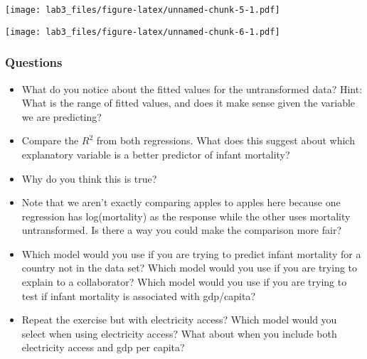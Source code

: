 \documentclass[
]{article}
\newenvironment{Shaded}{\begin{snugshade}}{\end{snugshade}}
\newcommand{\AttributeTok}[1]{\textcolor[rgb]{0.13,0.29,0.53}{#1}}
\newcommand{\DecValTok}[1]{\textcolor[rgb]{0.00,0.00,0.81}{#1}}
\newcommand{\FunctionTok}[1]{\textcolor[rgb]{0.13,0.29,0.53}{\textbf{#1}}}
\newcommand{\NormalTok}[1]{#1}
\newcommand{\OtherTok}[1]{\textcolor[rgb]{0.56,0.35,0.01}{#1}}
\newcommand{\SpecialCharTok}[1]{\textcolor[rgb]{0.81,0.36,0.00}{\textbf{#1}}}
\newcommand{\StringTok}[1]{\textcolor[rgb]{0.31,0.60,0.02}{#1}}
\providecommand{\tightlist}{%
  \setlength{\itemsep}{0pt}\setlength{\parskip}{0pt}}
\begin{document}
\texttt{[image: lab3\_files/figure-latex/unnamed-chunk-5-1.pdf]}

\begin{Shaded}
\end{Shaded}

\texttt{[image: lab3\_files/figure-latex/unnamed-chunk-6-1.pdf]}

\subsubsection{Questions}\label{questions-4}

\begin{itemize}
\tightlist
\item
  What do you notice about the fitted values for the untransformed data?
  Hint: What is the range of fitted values, and does it make sense given
  the variable we are predicting?
\item
  Compare the \(R^2\) from both regressions. What does this suggest
  about which explanatory variable is a better predictor of infant
  mortality?
\item
  Why do you think this is true?
\item
  Note that we aren't exactly comparing apples to apples here because
  one regression has log(mortality) as the response while the other uses
  mortality untransformed. Is there a way you could make the comparison
  more fair?
\item
  Which model would you use if you are trying to predict infant
  mortality for a country not in the data set? Which model would you use
  if you are trying to explain to a collaborator? Which model would you
  use if you are trying to test if infant mortality is associated with
  gdp/capita?
\item
  Repeat the exercise but with electricity access? Which model would you
  select when using electricity access? What about when you include both
  electricity access and gdp per capita?
\end{itemize}
\end{document}
